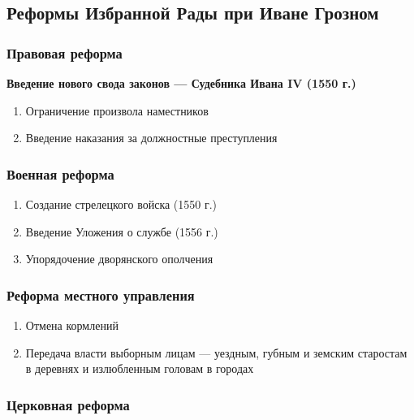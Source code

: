 \documentclass{article}
\begin{document}
\begin{multienumerate}
\end{multienumerate}

\subsection{Реформы Избранной Рады при Иване Грозном}

\subsubsection{Правовая реформа}

\textbf{Введение нового свода законов — Судебника Ивана IV (1550 г.)}

\begin{enumerate}
    \item Ограничение произвола наместников
    \item Введение наказания за должностные преступления
\end{enumerate}

\subsubsection{Военная реформа}

\begin{enumerate}
    \item Создание стрелецкого войска (1550 г.)
    \item Введение Уложения о службе (1556 г.)
    \item Упорядочение дворянского ополчения
\end{enumerate}

\subsubsection{Реформа местного управления}

\begin{enumerate}
    \item Отмена кормлений
    \item Передача власти выборным лицам — уездным, губным и земским старостам в деревнях и излюбленным головам в городах
\end{enumerate}

\subsubsection{Церковная реформа}
\end{document}
